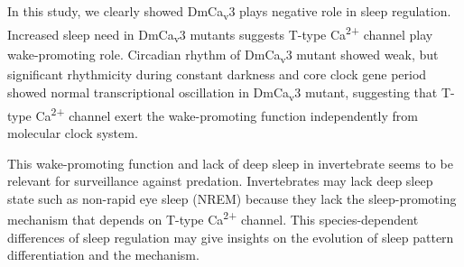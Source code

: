 In this study, we clearly showed DmCa\textsubscript{v}3 plays negative role in sleep regulation.
Increased sleep need in DmCa\textsubscript{v}3 mutants suggests T-type Ca\textsuperscript{2+} channel play wake-promoting role.
Circadian rhythm of DmCa\textsubscript{v}3 mutant showed weak, but significant rhythmicity during constant darkness and core clock gene period showed normal transcriptional oscillation in DmCa\textsubscript{v}3 mutant, suggesting that T-type Ca\textsuperscript{2+} channel exert the wake-promoting function independently from molecular clock system.

This wake-promoting function and lack of deep sleep in invertebrate seems to be relevant for surveillance against predation.
Invertebrates may lack deep sleep state such as non-rapid eye sleep (NREM) because they lack the sleep-promoting mechanism that depends on T-type Ca\textsuperscript{2+} channel.
This species-dependent differences of sleep regulation may give insights on the evolution of sleep pattern differentiation and the mechanism.
  
  
  
  
  